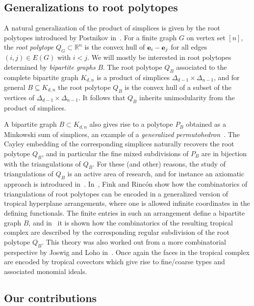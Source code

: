 \subsection{Generalizations to root polytopes}
 A natural generalization of the product of simplices is given by the root polytopes introduced by Postnikov in~\cite{postnikov2009permutohedra}.  For a finite graph $G$ on vertex set $[n]$, the \emph{root polytope} $Q_G \subset {\mathbb R}^n$ is the convex hull of ${\bf e}_i -{\bf e}_j$ for all edges $(i,j) \in E(G)$ with $i < j$.  We will mostly be interested in root polytopes determined by \emph{bipartite graphs} $B$. The root polytope $Q_B$ associated to the complete bipartite graph $K_{d,n}$ is a product of simplices $\Delta_{d-1} \times \Delta_{n-1}$, and for general $B \subseteq K_{d,n}$ the root polytope $Q_B$ is the convex hull of a subset of the vertices of $\Delta_{d-1} \times \Delta_{n-1}$.  
 It follows that $Q_B$ inherits unimodularity from the product of simplices.
 
A bipartite graph $B \subset K_{d,n}$ also gives rise to a polytope $P_B$ obtained as a Minkowski sum of simplices, an example of a \emph{generalized permutohedron}~\cite{postnikov2009permutohedra}. The Cayley embedding of the corresponding simplices naturally recovers the root polytope $Q_B$, and in particular the fine mixed subdivisions of $P_B$ are in bijection with the triangulations of $Q_B$. For these (and other) reasons, the study of triangulations of $Q_B$ is an active area of research, and for instance an axiomatic approach is introduced in~\cite{galashin2018trianguloids}.
In~\cite{fink2015stiefel}, Fink and Rinc\'on show how the combinatorics of triangulations of root polytopes can be encoded in a generalized version of tropical hyperplane arrangements, where one is allowed infinite coordinates in the defining functionals.  The finite entries in such an arrangement define a bipartite graph $B$, and in~\cite{fink2015stiefel} it is shown how the combinatorics of the resulting tropical complex are described by the corresponding regular subdivision of the root polytope $Q_B$. This theory was also worked out from a more combinatorial perspective by Joswig and Loho in~\cite{JoswigLoho:2016}. Once again the faces in the tropical complex are encoded by tropical covectors which give rise to fine/coarse types and associated monomial ideals. 

\subsection{Our contributions}

